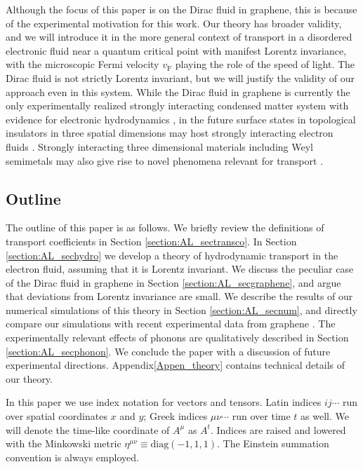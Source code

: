 Although the focus of this paper is on the Dirac fluid in graphene, this is because of the experimental motivation for this work.   Our theory has broader validity, and we will introduce it in the more general context of transport in a disordered electronic fluid near a quantum critical point with manifest Lorentz invariance, with the microscopic Fermi velocity $v_{\mathrm{F}}$ playing the role of the speed of light.  The Dirac fluid is not strictly Lorentz invariant, but we will justify the validity of our approach even in this system.   While the Dirac fluid in graphene is currently the only experimentally realized strongly interacting condensed matter system with evidence for electronic hydrodynamics \cite{crossno_observation_2016},  in the future surface states in topological insulators in three spatial dimensions  may host strongly interacting electron fluids \cite{efimkin_strongly_2014}.  Strongly interacting three dimensional materials including Weyl semimetals \cite{lu_experimental_2015, xu_discovery_2015, lv_experimental_2015} may also give rise to novel phenomena relevant for transport \cite{nielsen_adler-bell-jackiw_1983,son_chiral_2013}.

\subsection{Outline}
The outline of this paper is as follows.  We briefly review the definitions of transport coefficients in Section \ref{section:AL_sectransco}.   In Section \ref{section:AL_sechydro} we develop a theory of hydrodynamic transport in the electron fluid, assuming that it is Lorentz invariant.  We discuss the peculiar case of the Dirac fluid in graphene in Section \ref{section:AL_secgraphene}, and argue that deviations from Lorentz invariance are small.   We describe the results of our numerical simulations of this theory in Section \ref{section:AL_secnum}, and directly compare our simulations with recent experimental data from graphene \cite{crossno_observation_2016}.  The experimentally relevant effects of phonons are qualitatively described in Section \ref{section:AL_secphonon}.  We conclude the paper with a discussion of future experimental directions.  Appendix\ref{Appen_theory} contains technical details of our theory.

In this paper we use index notation for vectors and tensors.  Latin indices $ij\cdots$ run over spatial coordinates $x$ and $y$;  Greek indices $\mu\nu\cdots$ run over time $t$ as well.   We will denote the time-like coordinate of $A^\mu$ as $A^t$.  Indices are raised and lowered with the Minkowski metric $\eta^{\mu\nu} \equiv \mathrm{diag}(-1,1,1)$.  The Einstein summation convention is always employed.

